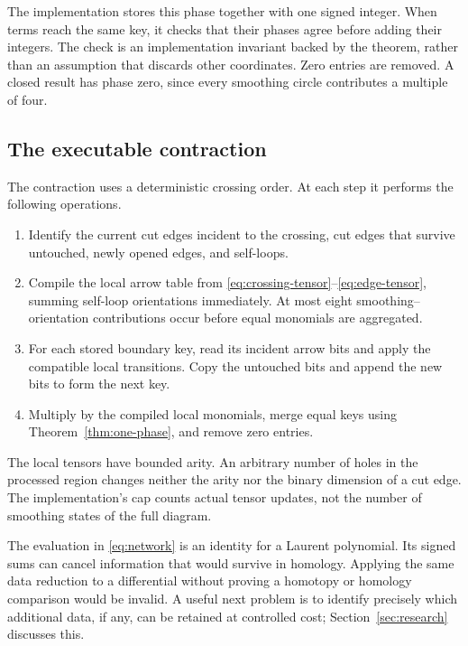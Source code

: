 The implementation stores this phase together with one signed integer.
When terms reach the same key, it checks that their phases agree before
adding their integers. The check is an implementation invariant backed by
the theorem, rather than an assumption that discards other coordinates.
Zero entries are removed. A closed result has phase zero, since every
smoothing circle contributes a multiple of four.

\subsection{The executable contraction}

The contraction uses a deterministic crossing order. At each step it
performs the following operations.
\begin{enumerate}
\item Identify the current cut edges incident to the crossing, cut edges
that survive untouched, newly opened edges, and self-loops.
\item Compile the local arrow table from
\eqref{eq:crossing-tensor}--\eqref{eq:edge-tensor}, summing self-loop
orientations immediately. At most eight smoothing--orientation
contributions occur before equal monomials are aggregated.
\item For each stored boundary key, read its incident arrow bits and
apply the compatible local transitions. Copy the untouched bits and
append the new bits to form the next key.
\item Multiply by the compiled local monomials, merge equal keys using
Theorem~\ref{thm:one-phase}, and remove zero entries.
\end{enumerate}
The local tensors have bounded arity. An arbitrary number of holes in the
processed region changes neither the arity nor the binary dimension of a
cut edge. The implementation's cap counts actual tensor updates, not the
number of smoothing states of the full diagram.

\begin{remark}
The evaluation in \eqref{eq:network} is an identity for a Laurent
polynomial. Its signed sums can cancel information that would survive in
homology. Applying the same data reduction to a differential without
proving a homotopy or homology comparison would be invalid. A useful next
problem is to identify precisely which additional data, if any, can be
retained at controlled cost; Section~\ref{sec:research} discusses this.
\end{remark}
